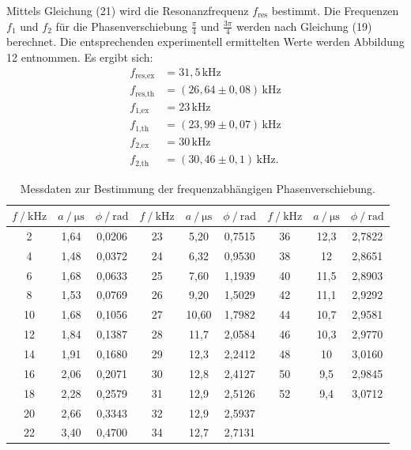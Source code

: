 Mittels Gleichung (21) wird die Resonanzfrequenz $f_\text{res}$ bestimmt. 
Die Frequenzen $f_\text{1}$ und $f_\text{2}$ für die Phasenverschiebung $\frac{\pi}{4}$
und $\frac{3\pi}{4}$ werden nach Gleichung (19) berechnet. Die entsprechenden experimentell
ermittelten Werte werden Abbildung 12 entnommen. Es ergibt sich:
\begin{align*}
f_\text{res,ex} &= 31,5\, \si{\kilo\hertz}\\
f_\text{res,th} &= (26,64 \pm 0,08)\,\si{\kilo\hertz}\\
f_\text{1,ex} &= 23\,\si{\kilo\hertz}\\
f_\text{1,th} &= (23,99 \pm 0,07)\,\si{\kilo\hertz}\\
f_\text{2,ex} &= 30\,\si{\kilo\hertz}\\
f_\text{2,th} &= (30,46 \pm 0,1)\,\si{\kilo\hertz}.
\end{align*}

\begin{table}
\centering
\caption{Messdaten zur Bestimmung der frequenzabhängigen Phasenverschiebung.}
\label{tab:some_data}
\begin{tabular}{c c c c c c c c c}
\toprule
$f\:/\:\si{\kilo\hertz}$ & $a\:/\:\si{\micro\second}$ & $\phi\:/\:\text{rad}$ & $f\:/\:\si{\kilo\hertz}$ & $a\:/\:\si{\micro\second}$ & $\phi\:/\:\text{rad}$ & $f\:/\:\si{\kilo\hertz}$ & $a\:/\:\si{\micro\second}$ & $\phi\:/\:\text{rad}$ \\
\midrule
2  & 1,64 & 0,0206  & 23 & 5,20 & 0,7515 & 36 & 12,3 & 2,7822 \\
4  & 1,48  & 0,0372 & 24 & 6,32 & 0,9530 & 38 & 12 &  2,8651 \\
6  & 1,68  & 0,0633 & 25 & 7,60 & 1,1939 & 40 & 11,5 &  2,8903 \\
8  & 1,53  & 0,0769 & 26 & 9,20 & 1,5029 & 42 & 11,1  &  2,9292 \\
10 & 1,68  & 0,1056 & 27 & 10,60 & 1,7982 & 44 & 10,7  &  2,9581 \\
12 & 1,84  & 0,1387 & 28 & 11,7 & 2,0584 & 46 & 10,3  &  2,9770 \\
14 & 1,91  & 0,1680 & 29 & 12,3 & 2,2412 & 48 & 10  &  3,0160 \\
16 & 2,06  & 0,2071 & 30 & 12,8 & 2,4127 & 50 & 9,5  &  2,9845 \\
18 & 2,28  & 0,2579 & 31 & 12,9 & 2,5126 & 52 & 9,4  &  3,0712 \\
20 & 2,66  & 0,3343 & 32 & 12,9 & 2,5937 & & & \\
22 & 3,40  & 0,4700 & 34 & 12,7 & 2,7131 & & & \\
\bottomrule
\end{tabular}
\end{table}

